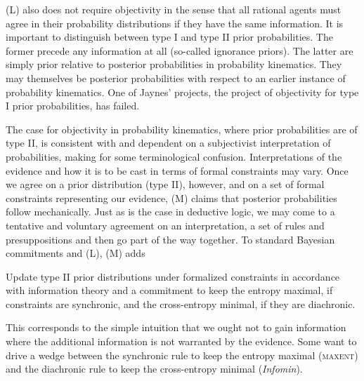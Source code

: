 \documentclass[11pt]{article}
\begin{document}
(L) also does not require objectivity in the sense that all rational
agents must agree in their probability distributions if they have the
same information. It is important to distinguish between type I and
type II prior probabilities. The former precede any information at all
(so-called ignorance priors). The latter are simply prior relative to
posterior probabilities in probability kinematics. They may themselves
be posterior probabilities with respect to an earlier instance of
probability kinematics. One of Jaynes' projects, the project of
objectivity for type I prior probabilities, has failed.

The case for objectivity in probability kinematics, where prior
probabilities are of type II, is consistent with and dependent on a
subjectivist interpretation of probabilities, making for some
terminological confusion. Interpretations of the evidence and how it
is to be cast in terms of formal constraints may vary. Once we agree
on a prior distribution (type II), however, and on a set of formal
constraints representing our evidence, (M) claims that posterior
probabilities follow mechanically. Just as is the case in deductive
logic, we may come to a tentative and voluntary agreement on an
interpretation, a set of rules and presuppositions and then go part of
the way together. To standard Bayesian commitments and (L), (M) adds


\begin{quotex}
  Update type II prior distributions under formalized constraints in
  accordance with information theory and a commitment to keep the
  entropy maximal, if constraints are synchronic, and the
  cross-entropy minimal, if they are diachronic.
\end{quotex}

This corresponds to the simple intuition that we ought not to gain
information where the additional information is not warranted by the
evidence. Some want to drive a wedge between the synchronic rule to
keep the entropy maximal (\textsc{maxent}) and the diachronic rule to
keep the cross-entropy minimal (\emph{Infomin}). 
\end{document}
